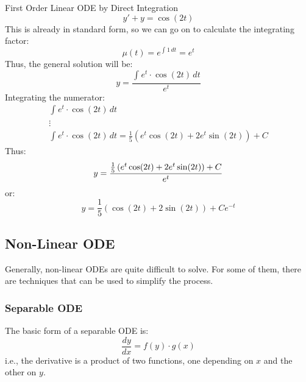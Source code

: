 \documentclass[12pt]{article}
\begin{document}
\begin{example}{First Order Linear ODE by Direct Integration}
  \begin{equation*}
    y' + y = \cos(2t)
  \end{equation*}
  This is already in standard form, so we can go on to calculate the integrating factor:
  \begin{equation*}
    \mu(t) = e^{\int_{}^{} 1 \,dt} = e^t
  \end{equation*}
  Thus, the general solution will be:
  \begin{equation*}
    y = \frac{\int_{}^{} e^t \cdot \cos(2t) \,dt}{e^t}
  \end{equation*}
  Integrating the numerator:
  \begin{gather*}
    \int_{}^{} e^t \cdot \cos(2t) \,dt \\
    \vdots \\
    \int_{}^{} e^t \cdot \cos(2t) \,dt = \frac{1}{5}\left(e^t \cos(2t) + 2e^t \sin(2t)\right) + C
  \end{gather*}
  Thus:
  \begin{equation*}
    y = \frac{\frac{1}{5}\left(e^t \cos(2t) + 2e^t \sin(2t)\right) + C}{e^t} \\
  \end{equation*}
  or:
  \begin{equation*}
    y = \frac{1}{5}\left(\cos(2t) + 2\sin(2t)\right) + Ce^{-t}
  \end{equation*}
\end{example}

\subsection{Non-Linear ODE}
\label{ssec:nonLinearODE}

Generally, non-linear ODEs are quite difficult to solve. For some of them, there are techniques that can be used to simplify the process.

\subsubsection{Separable ODE}
\label{sssec:separableODE}

The basic form of a separable ODE is:
\begin{equation*}
  \frac{dy}{dx} = f(y) \cdot g(x)
\end{equation*}
i.e., the derivative is a product of two functions, one depending on $x$ and the other on $y$.
\end{document}
